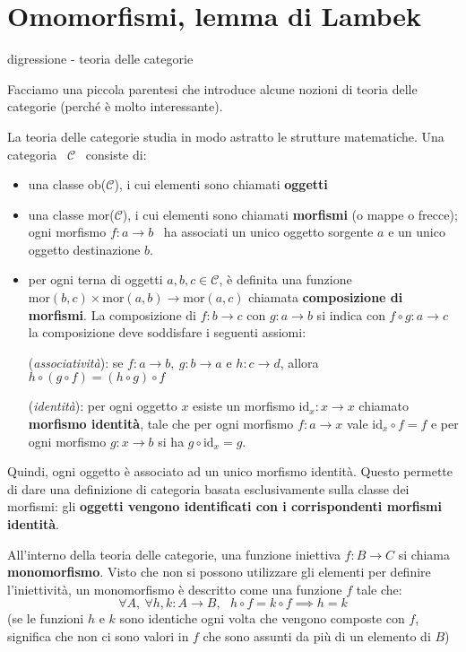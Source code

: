 \documentclass[a4paper,11pt]{report}
\begin{document}
\section{Omomorfismi, lemma di Lambek}
\begin{gbox}{digressione - teoria delle categorie}

    Facciamo una piccola parentesi che introduce alcune nozioni di teoria delle categorie (perché è molto interessante).

    La teoria delle categorie studia in modo astratto le strutture matematiche. Una categoria  \ \( \mathcal{C} \) \ consiste di:
    \begin{itemize}
        \item  una classe ob(\( \mathcal{C} \)), i cui elementi sono chiamati \textbf{oggetti}
        \item  una classe mor(\( \mathcal{C} \)), i cui elementi sono chiamati \textbf{morfismi} (o mappe o frecce); ogni morfismo \( f: a \to b \) \ ha associati un unico oggetto sorgente \( a \) e un unico oggetto destinazione \( b \).
        \item per ogni terna di oggetti \( a, b, c \in \mathcal{C}\), è definita una funzione \( \text{mor}(b, c) \times \text{mor}(a,b) \to \text{mor}(a, c) \) chiamata \textbf{composizione di morfismi}. La composizione di \( f: b \to c \) con \( g: a \to b \) si indica con \( f \circ g: a \to c \)
            \subitem la composizione deve soddisfare i seguenti assiomi:

            (\textit{associatività}): se \( f: a \to b, \ g: b \to a \text{ e } h: c \to d\), allora \( h \circ (g \circ f) = (h \circ g) \circ f \)

            (\textit{identità}): per ogni oggetto \( x \) esiste un morfismo \( \text{id}_x : x \to x \) chiamato \textbf{morfismo identità}, tale che per ogni morfismo \( f: a \to x \) vale \( \text{id}_x \circ f = f \) e per ogni morfismo \( g : x \to b \) si ha \( g \circ \text{id}_x = g \).
    \end{itemize}

    Quindi, ogni oggetto è associato ad un unico morfismo identità. Questo permette di dare una definizione di categoria basata esclusivamente sulla classe dei morfismi: gli \textbf{oggetti vengono identificati con i corrispondenti morfismi identità}.

    All'interno della teoria delle categorie, una funzione iniettiva \( f: B \to C \) si chiama \textbf{monomorfismo}. Visto che non si possono utilizzare gli elementi per definire l'iniettività, un monomorfismo è descritto come una funzione \( f \) tale che:
    \[
        \forall A, \ \forall h, k : A \to B, \ \ \ h \circ f = k \circ f \implies h = k
    \]
    (se le funzioni \( h \) e \( k \) sono identiche ogni volta che vengono composte con \( f \), significa che non ci sono valori in \( f \) che sono assunti da più di un elemento di \( B \))
\end{gbox}
\end{document}
